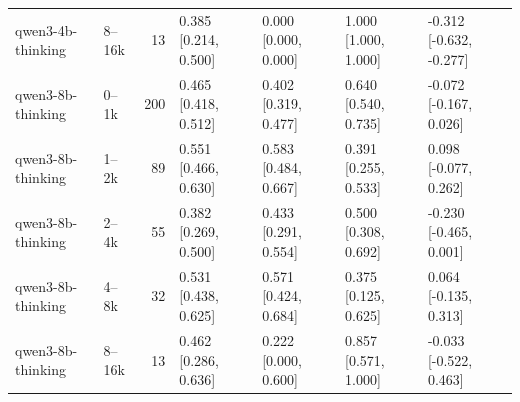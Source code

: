 \begin{table}
\begin{tabular}{llrllll}
qwen3-4b-thinking & 8–16k & 13 & 0.385 [0.214, 0.500] & 0.000 [0.000, 0.000] & 1.000 [1.000, 1.000] & -0.312 [-0.632, -0.277] \\
qwen3-8b-thinking & 0–1k & 200 & 0.465 [0.418, 0.512] & 0.402 [0.319, 0.477] & 0.640 [0.540, 0.735] & -0.072 [-0.167, 0.026] \\
qwen3-8b-thinking & 1–2k & 89 & 0.551 [0.466, 0.630] & 0.583 [0.484, 0.667] & 0.391 [0.255, 0.533] & 0.098 [-0.077, 0.262] \\
qwen3-8b-thinking & 2–4k & 55 & 0.382 [0.269, 0.500] & 0.433 [0.291, 0.554] & 0.500 [0.308, 0.692] & -0.230 [-0.465, 0.001] \\
qwen3-8b-thinking & 4–8k & 32 & 0.531 [0.438, 0.625] & 0.571 [0.424, 0.684] & 0.375 [0.125, 0.625] & 0.064 [-0.135, 0.313] \\
qwen3-8b-thinking & 8–16k & 13 & 0.462 [0.286, 0.636] & 0.222 [0.000, 0.600] & 0.857 [0.571, 1.000] & -0.033 [-0.522, 0.463] \\
\bottomrule
\end{tabular}
\end{table}
